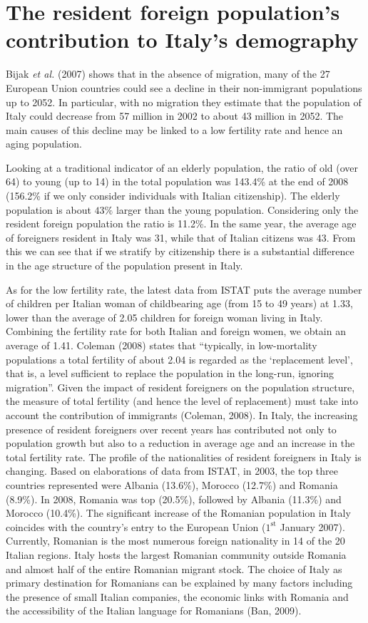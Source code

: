 \documentclass[12pt]{article}
\theoremstyle{definition}
\theoremstyle{plain}
\begin{document}
\section{The resident foreign population's contribution to Italy's demography \label{DEM}}

Bijak \textit{et al.} (2007) shows that in the absence of migration, many of the 27 European Union countries could see a decline in their non-immigrant populations up to 2052. In particular, with no migration they estimate that the population of Italy could decrease from 57 million in 2002 to about 43 million in 2052. The main causes of this decline may be linked to a low fertility rate and hence an aging population. 

Looking at a traditional indicator of an elderly population, the ratio of old (over 64) to young (up to 14) in the total population was 143.4\% at the end of 2008 (156.2\% if we only consider individuals with Italian citizenship). The elderly population is about $43\%$ larger than the young population. Considering only the resident foreign population the ratio is 11.2\%. In the same year, the average age of foreigners resident in Italy was 31, while that of Italian citizens was 43. From this we can see that if we stratify by citizenship there is a substantial difference in the age structure of the population present in Italy.

As for the low fertility rate, the latest data from ISTAT puts the average number of children per Italian woman of childbearing age (from 15 to 49 years) at 1.33, lower than the average of 2.05 children for foreign woman living in Italy. Combining the fertility rate for both Italian and foreign women, we obtain an average of 1.41. Coleman (2008) states that ``typically, in low-mortality populations a total fertility of about 2.04 is regarded as the `replacement level', that is, a level sufficient to replace the population in the long-run, ignoring migration''. Given the impact of resident foreigners on the population structure, the measure of total fertility (and hence the level of replacement) must take into account the contribution of immigrants (Coleman, 2008). In Italy, the increasing presence of resident foreigners over recent years has contributed not only to population growth but also to a reduction in average age and an increase in the total fertility rate. The profile of the nationalities of resident foreigners in Italy is changing. Based on elaborations of data from ISTAT, in 2003, the top three countries represented were Albania (13.6\%), Morocco (12.7\%) and Romania (8.9\%). In 2008, Romania was top (20.5\%), followed by Albania (11.3\%) and Morocco (10.4\%). The significant increase of the Romanian population in Italy coincides with the country's entry to the European Union ($1^\text{st}$ January 2007). Currently, Romanian is the most numerous foreign nationality in 14 of the 20 Italian regions. Italy hosts the largest Romanian community outside Romania and almost half of the entire Romanian migrant stock. The choice of Italy as primary destination for Romanians can be explained by many factors including the presence of small Italian companies, the economic links with Romania and the accessibility of the Italian language for Romanians (Ban, 2009). 
\end{document}
